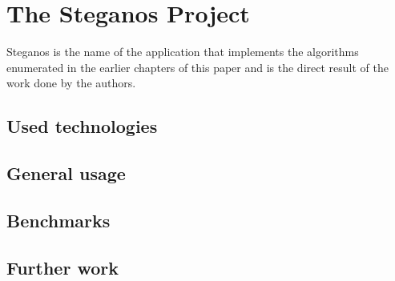 
\chapter{The Steganos Project}

Steganos is the name of the application that implements the algorithms enumerated in the earlier chapters of this paper and is the direct result of the work done by the authors.

\section{Used technologies}

\section{General usage}

\section{Benchmarks}

\section{Further work}